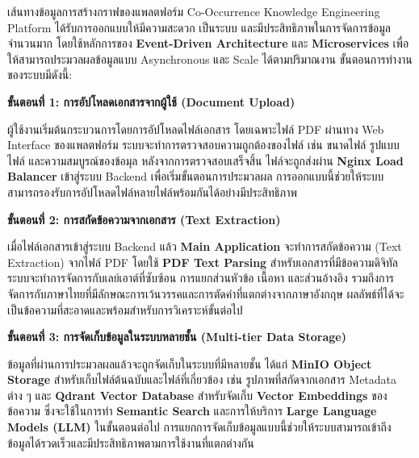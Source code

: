 \documentclass[12pt,a4paper]{article}
\newcommand{\textlight}[1]{{\thailightfont #1}}
\begin{document}
\begin{enumerate}[leftmargin=2cm]
\begin{enumerate}
        \textlight{
            \hspace{1cm}เส้นทางข้อมูลการสร้างกราฟของแพลตฟอร์ม Co-Occurrence Knowledge Engineering Platform ได้รับการออกแบบให้มีความสะดวก เป็นระบบ และมีประสิทธิภาพในการจัดการข้อมูลจำนวนมาก โดยใช้หลักการของ \textbf{Event-Driven Architecture} และ \textbf{Microservices} เพื่อให้สามารถประมวลผลข้อมูลแบบ Asynchronous และ Scale ได้ตามปริมาณงาน ขั้นตอนการทำงานของระบบมีดังนี้:

            \vspace{0.5cm}

            \textbf{ขั้นตอนที่ 1: การอัปโหลดเอกสารจากผู้ใช้ (Document Upload)}

            \hspace{1cm}ผู้ใช้งานเริ่มต้นกระบวนการโดยการอัปโหลดไฟล์เอกสาร โดยเฉพาะไฟล์ PDF ผ่านทาง Web Interface ของแพลตฟอร์ม ระบบจะทำการตรวจสอบความถูกต้องของไฟล์ เช่น ขนาดไฟล์ รูปแบบไฟล์ และความสมบูรณ์ของข้อมุล หลังจากการตรวจสอบเสร็จสิ้น ไฟล์จะถูกส่งผ่าน \textbf{Nginx Load Balancer} เข้าสู่ระบบ Backend เพื่อเริ่มขั้นตอนการประมวลผล การออกแบบนี้ช่วยให้ระบบสามารถรองรับการอัปโหลดไฟล์หลายไฟล์พร้อมกันได้อย่างมีประสิทธิภาพ

            \vspace{0.3cm}

            \textbf{ขั้นตอนที่ 2: การสกัดข้อความจากเอกสาร (Text Extraction)}

            \hspace{1cm}เมื่อไฟล์เอกสารเข้าสู่ระบบ Backend แล้ว \textbf{Main Application} จะทำการสกัดข้อความ (Text Extraction) จากไฟล์ PDF โดยใช้ \textbf{PDF Text Parsing} สำหรับเอกสารที่มีข้อความดิจิทัล ระบบจะทำการจัดการกับเลย์เอาต์ที่ซับซ้อน การแยกส่วนหัวข้อ เนื้อหา และส่วนอ้างอิง รวมถึงการจัดการกับภาษาไทยที่มีลักษณะการเว้นวรรคและการตัดคำที่แตกต่างจากภาษาอังกฤษ ผลลัพธ์ที่ได้จะเป็นข้อความที่สะอาดและพร้อมสำหรับการวิเคราะห์ขั้นต่อไป

            \vspace{0.3cm}

            \textbf{ขั้นตอนที่ 3: การจัดเก็บข้อมูลในระบบหลายชั้น (Multi-tier Data Storage)}

            \hspace{1cm}ข้อมูลที่ผ่านการประมวลผลแล้วจะถูกจัดเก็บในระบบที่มีหลายชั้น ได้แก่ \textbf{MinIO Object Storage} สำหรับเก็บไฟล์ต้นฉบับและไฟล์ที่เกี่ยวข้อง เช่น รูปภาพที่สกัดจากเอกสาร Metadata ต่าง ๆ และ \textbf{Qdrant Vector Database} สำหรับจัดเก็บ \textbf{Vector Embeddings} ของข้อความ ซึ่งจะใช้ในการทำ \textbf{Semantic Search} และการให้บริการ \textbf{Large Language Models (LLM)} ในขั้นตอนต่อไป การแยกการจัดเก็บข้อมูลแบบนี้ช่วยให้ระบบสามารถเข้าถึงข้อมูลได้รวดเร็วและมีประสิทธิภาพตามการใช้งานที่แตกต่างกัน

}
\end{enumerate}
\end{enumerate}
\end{document}
